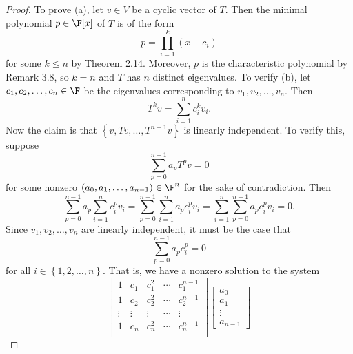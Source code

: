 \documentclass[linearalgebraII]{subfiles}
\begin{document}
    \begin{proof}
        To prove (a), let $v\in V$ be a cyclic vector of $T$. Then the minimal polynomial $p\in\F[x]$ of $T$ is of the form
        \begin{equation*}
            p = \prod^{k}_{i=1} (x-c_i)
        \end{equation*}
        for some $k\leq n$ by Theorem 2.14. Moreover, $p$ is the characteristic polynomial by Remark 3.8, so $k=n$ and $T$ has $n$ distinct eigenvalues. To verify (b), let $c_1, c_2, \ldots, c_n\in\F$ be the eigenvalues corresponding to $v_1, v_2, \ldots, v_n$. Then
        \begin{equation*}
            T^kv = \sum^{n}_{i=1} c_i^kv_i.
        \end{equation*}
        Now the claim is that $\left\lbrace v, Tv, \ldots, T^{n-1}v \right\rbrace$ is linearly independent. To verify this, suppose
        \begin{equation*}
            \sum^{n-1}_{p=0} a_pT^pv = 0
        \end{equation*}
        for some nonzero $\left( a_0, a_1, \ldots, a_{n-1} \right)\in\F^n$ for the sake of contradiction. Then
        \begin{equation*}
            \sum^{n-1}_{p=0} a_p \sum^{n}_{i=1} c_i^pv_i = \sum^{n-1}_{p=0} \sum^{n}_{i=1} a_pc_i^pv_i = \sum^{n}_{i=1} \sum^{n-1}_{p=0} a_pc_i^pv_i = 0.
        \end{equation*}
        Since $v_1, v_2, \ldots, v_n$ are linearly independent, it must be the case that
        \begin{equation*}
            \sum^{n-1}_{p=0} a_pc_i^p = 0
        \end{equation*}
        for all $i\in \left\lbrace 1, 2, \ldots, n \right\rbrace$. That is, we have a nonzero solution to the system
        \begin{equation*}
            \begin{bmatrix}
                1 & c_1 & c_1^2 & \cdots & c_1^{n-1} \\
                1 & c_2 & c_2^2 & \cdots & c_2^{n-1} \\
                \vdots & \vdots & \vdots & \cdots & \vdots \\
                1 & c_n & c_n^2 & \cdots & c_n^{n-1} \\
            \end{bmatrix}
            \begin{bmatrix}
                a_0 \\ a_1 \\ \vdots \\ a_{n-1}

\end{bmatrix}
\end{equation*}
\end{proof}
\end{document}
